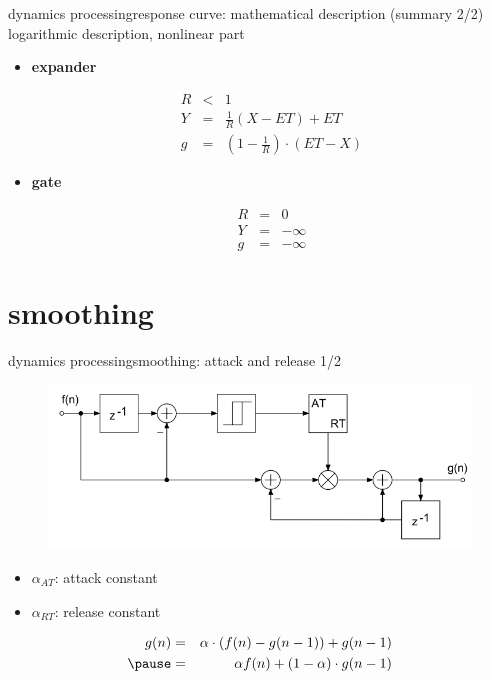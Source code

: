 \begin{frame}{dynamics processing}{response curve: mathematical description (summary 2/2)}
	\vspace{-2mm}
    logarithmic description, nonlinear part
    \bigskip
	\begin{itemize}
		\item	\textbf{expander}
			\begin{footnotesize}\begin{eqnarray*}
				R &<& 1\\
				Y &=& \frac{1}{R}\left(X-ET\right) + ET\\
				g &=& \left(1-\frac{1}{R}\right)\cdot (ET-X)
			\end{eqnarray*}\end{footnotesize}
		\pause
		\item	\textbf{gate}
			\begin{footnotesize}\begin{eqnarray*}
				R &=& 0\\
				Y &=& -\infty\\
				g &=& -\infty
			\end{eqnarray*}\end{footnotesize}
	\end{itemize}
\end{frame}

\section{smoothing}
\begin{frame}{dynamics processing}{smoothing: attack and release 1/2}
	\begin{figure}
		\centering
			\includegraphics[scale=.5]{graph/smooth_control}
	\end{figure}
	\begin{itemize}
		\item	$\alpha_{AT}$: attack constant
		\item	$\alpha_{RT}$: release constant
	\end{itemize}
	
	\pause
	\begin{eqnarray*}
		g(n) &=& \alpha\cdot(f(n)-g(n-1)) + g(n-1)\nonumber\\
		\pause
			&=& \alpha f(n) + (1-\alpha)\cdot g(n-1)
	\end{eqnarray*}
\end{frame}

